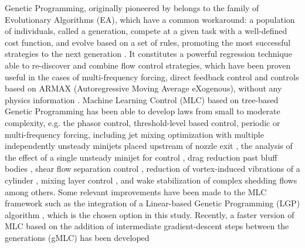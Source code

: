 Genetic Programming, originally pioneered by \citet{koza1994} belongs to the family of Evolutionary Algorithms (EA), which have a common workaround: a population of individuals, called a generation, compete at a given task with a well-defined cost function, and evolve based on a set of rules, promoting the most successful strategies to the next generation \citep{banzhaf1998genetic, duriez2017book}. It constitutes a powerful regression technique able to re-discover and combine flow control strategies, which have been proven useful in the cases of multi-frequency forcing, direct feedback control and controls based on ARMAX (Autoregressive Moving Average eXogenous), without any physics information \citep{cornejomaceda2019pamm,cornejo2021gMLC}. 
Machine Learning Control (MLC)\citep{duriez2017book} based on tree-based Genetic Programming has been able to develop laws from small to moderate complexity, e.g. the phasor control, threshold-level based control, periodic or multi-frequency forcing, including jet mixing optimization with multiple independently unsteady minijets placed upstream of nozzle exit \citep{zhou2020artificial}, the analysis of the effect of a single unsteady minijet for control \citep{Wu2018jet}, drag reduction past bluff bodies \citep{li2019prf} , shear flow separation control \citep{gautier2015MLC}, reduction of vortex-induced vibrations of a cylinder \citep{Ren2019pof}, mixing layer control \citep{Parezanovic2016jfm}, and wake stabilization of complex shedding flows \citep{raibaudo2019pof} among others.
Some relevant improvements have been made to the MLC framework  such as the integration of a Linear-based Genetic Programming (LGP) algorithm \citep{li2017GP}, which is the chosen option in this study. Recently, a faster version of MLC based on the addition of intermediate gradient-descent steps between the generations (gMLC) has been developed \citep{cornejo2021gMLC}


